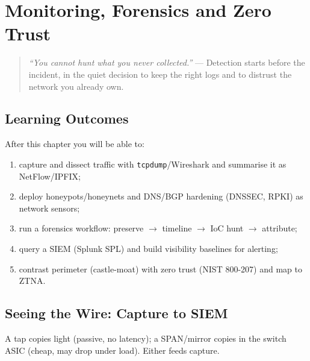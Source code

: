 \chapter{Monitoring, Forensics and Zero Trust}\label{ch:monitor}
\sloppy

\begin{quote}
\emph{``You cannot hunt what you never collected.''} --- Detection starts before the incident, in the quiet decision to keep the right logs and to distrust the network you already own.
\end{quote}

\noindent{}
\vspace{0.4em}

\section*{Learning Outcomes}
After this chapter you will be able to:
\begin{enumerate}[label=(L\arabic*)]
    \item capture and dissect traffic with \texttt{tcpdump}/Wireshark and summarise it as NetFlow/IPFIX;
    \item deploy honeypots/honeynets and DNS/BGP hardening (DNSSEC, RPKI) as network sensors;
    \item run a forensics workflow: preserve $\to$ timeline $\to$ IoC hunt $\to$ attribute;
    \item query a SIEM (Splunk SPL) and build visibility baselines for alerting;
    \item contrast perimeter (castle-moat) with zero trust (NIST 800-207) and map to ZTNA.
\end{enumerate}

\section{Seeing the Wire: Capture to SIEM}\label{sec:visibility}
A tap copies light (passive, no latency); a SPAN/mirror copies in the switch ASIC (cheap, may drop under load). Either feeds capture.

